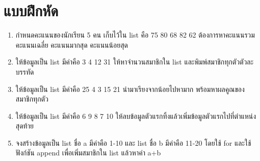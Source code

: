 \section{แบบฝึกหัด}
\begin{enumerate} 
\item กำหนดคะแนนของนักเรียน 5 คน เก็บไว้ใน list คือ 75 80 68 82 62 ต้องการหาคะแนนรวม คะแนนเฉลี่ย คะแนนมากสุด คะแนนน้อยสุด 
\item ให้ข้อมูลเป็น list มีค่าคือ 3 4 12 31 ให้หาจำนวนสมาชิกใน list  และพิมพ์สมาชิกทุกตัวตัวละบรรทัด
\item ให้ข้อมูลเป็น list มีค่าคือ 25 4 3 15 21 นำมาเรียงจากน้อยไปหามาก พร้อมหาผลคูณของสมาชิกทุกตัว
\item ให้ข้อมูลเป็น list มีค่าคือ 6 9 8 7 10 ให้ลบข้อมูลตัวแรกทิ้งแล้วเพิ่มข้อมูลตัวแรกไปที่ตำแหน่งสุดท้าย
\item จงสร้างข้อมูลเป็น list ชื่อ a มีค่าคือ 1-10 และ list ชื่อ b มีค่าคือ 11-20 โดยใช้ for และใช้ฟังก์ชัน append เพื่อเพิ่มสมาชิกใน list แล้วหาค่า a+b
\end{enumerate}


